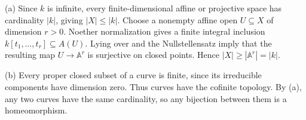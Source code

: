 (a) Since $k$ is infinite, every finite-dimensional affine or projective space has cardinality $|k|$, giving $|X|\le|k|$. Choose a nonempty affine open $U\subseteq X$ of dimension $r>0$. Noether normalization gives a finite integral inclusion $k[t_1,\ldots,t_r]\subseteq A(U)$. Lying over and the Nullstellensatz imply that the resulting map $U\to\mathbb A^r$ is surjective on closed points. Hence $|X|\ge|\mathbb A^r|=|k|$.

(b) Every proper closed subset of a curve is finite, since its irreducible components have dimension zero. Thus curves have the cofinite topology. By (a), any two curves have the same cardinality, so any bijection between them is a homeomorphism.
